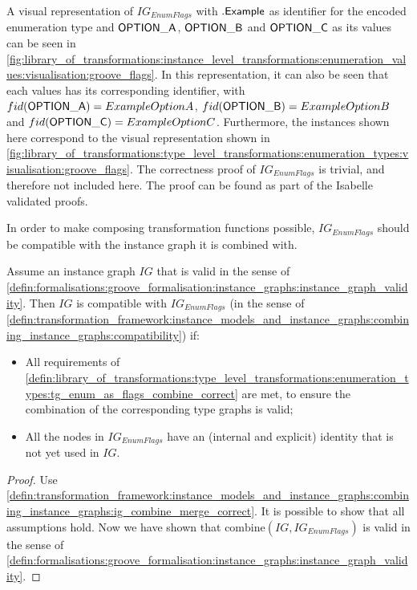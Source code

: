 A visual representation of $IG_{EnumFlags}$ with $.\mathsf{Example}$ as identifier for the encoded enumeration type and $\mathsf{OPTION\_A}$, $\mathsf{OPTION\_B}$ and $\mathsf{OPTION\_C}$ as its values can be seen in \cref{fig:library_of_transformations:instance_level_transformations:enumeration_values:visualisation:groove_flags}. In this representation, it can also be seen that each values has its corresponding identifier, with $fid(\mathsf{OPTION\_A}) = ExampleOptionA$, $fid(\mathsf{OPTION\_B}) = ExampleOptionB$ and $fid(\mathsf{OPTION\_C}) = ExampleOptionC$. Furthermore, the instances shown here correspond to the visual representation shown in \cref{fig:library_of_transformations:type_level_transformations:enumeration_types:visualisation:groove_flags}. The correctness proof of $IG_{EnumFlags}$ is trivial, and therefore not included here. The proof can be found as part of the Isabelle validated proofs.

In order to make composing transformation functions possible, $IG_{EnumFlags}$ should be compatible with the instance graph it is combined with.

\begin{thm}
\label{defin:library_of_transformations:instance_level_transformations:enumeration_values:ig_enum_as_flags_combine_correct}
Assume an instance graph $IG$ that is valid in the sense of \cref{defin:formalisations:groove_formalisation:instance_graphs:instance_graph_validity}. Then $IG$ is compatible with $IG_{EnumFlags}$ (in the sense of \cref{defin:transformation_framework:instance_models_and_instance_graphs:combining_instance_graphs:compatibility}) if:
\begin{itemize}
    \item All requirements of \cref{defin:library_of_transformations:type_level_transformations:enumeration_types:tg_enum_as_flags_combine_correct} are met, to ensure the combination of the corresponding type graphs is valid;
    \item All the nodes in $IG_{EnumFlags}$ have an (internal and explicit) identity that is not yet used in $IG$.
\end{itemize}
\end{thm}

\begin{proof}
Use \cref{defin:transformation_framework:instance_models_and_instance_graphs:combining_instance_graphs:ig_combine_merge_correct}. It is possible to show that all assumptions hold. Now we have shown that $\mathrm{combine}(IG, IG_{EnumFlags})$ is valid in the sense of \cref{defin:formalisations:groove_formalisation:instance_graphs:instance_graph_validity}.
\end{proof}

